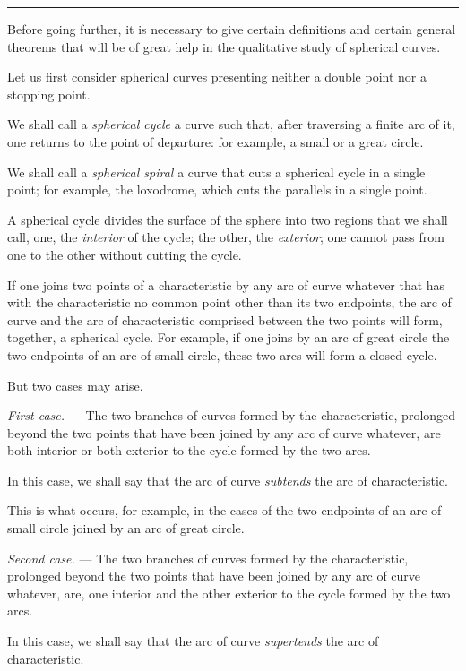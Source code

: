 \documentclass[11pt]{article}
\newcommand{\shortline}{\begin{center}\rule{3.5em}{0.4pt}\end{center}}
\begin{document}
\shortline

Before going further, it is necessary to give certain definitions and certain general theorems that will be of great help in the qualitative study of spherical curves.

Let us first consider spherical curves presenting neither a double point nor a stopping point.

We shall call a \emph{spherical cycle} a curve such that, after traversing a finite arc of it, one returns to the point of departure: for example, a small or a great circle.

We shall call a \emph{spherical spiral} a curve that cuts a spherical cycle in a single point; for example, the loxodrome, which cuts the parallels in a single point.

A spherical cycle divides the surface of the sphere into two regions that we shall call, one, the \emph{interior} of the cycle; the other, the \emph{exterior}; one cannot pass from one to the other without cutting the cycle.

If one joins two points of a characteristic by any arc of curve whatever that has with the characteristic no common point other than its two endpoints, the arc of curve and the arc of characteristic comprised between the two points will form, together, a spherical cycle. For example, if one joins by an arc of great circle the two endpoints of an arc of small circle, these two arcs will form a closed cycle.

But two cases may arise.

\emph{First case.} --- The two branches of curves formed by the characteristic, prolonged beyond the two points that have been joined by any arc of curve whatever, are both interior or both exterior to the cycle formed by the two arcs.

In this case, we shall say that the arc of curve \emph{subtends} the arc of characteristic.

This is what occurs, for example, in the cases of the two endpoints of an arc of small circle joined by an arc of great circle.

\emph{Second case.} --- The two branches of curves formed by the characteristic, prolonged beyond the two points that have been joined by any arc of curve whatever, are, one interior and the other exterior to the cycle formed by the two arcs.

In this case, we shall say that the arc of curve \emph{supertends} the arc of characteristic.
\end{document}
